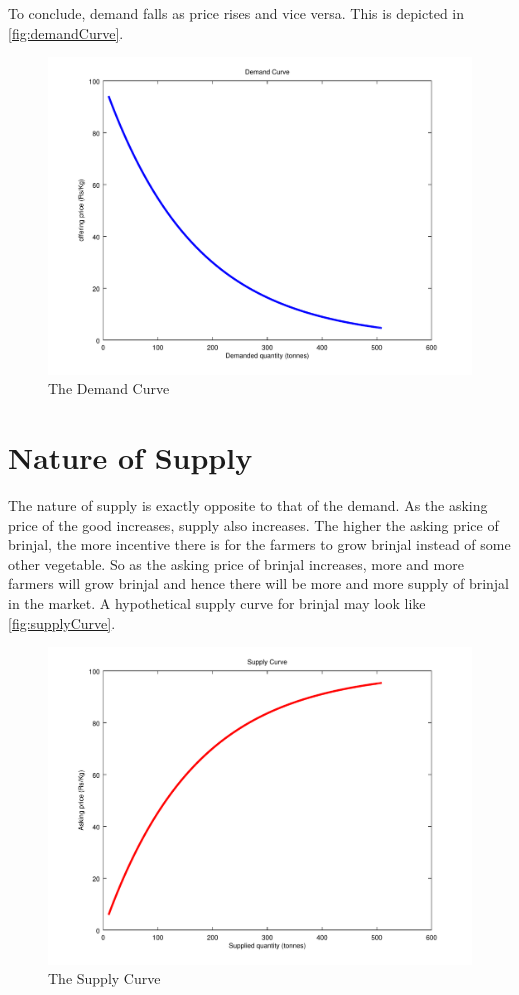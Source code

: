 To conclude, demand falls as price rises and vice versa. This is depicted in \autoref{fig:demandCurve}.
	\begin{figure}[h]
		\centering
		\includegraphics[width = \textwidth]{supplyDemand/demandCurve}
		\caption{The Demand Curve}
		\label{fig:demandCurve}
	\end{figure}
	
\section{Nature of Supply}
The nature of supply is exactly opposite to that of the demand. As the asking price of the good increases, supply also increases. The higher the asking price of brinjal, the more incentive there is for the farmers to grow brinjal instead of some other vegetable. So as the asking price of brinjal increases, more and more farmers will grow brinjal and hence there will be more and more supply of brinjal in the market. A hypothetical supply curve for brinjal may look like \autoref{fig:supplyCurve}.

	\begin{figure}[h]
		\centering
		\includegraphics[width = \textwidth]{supplyDemand/supplyCurve}
		\caption{The Supply Curve}
		\label{fig:supplyCurve}
	\end{figure}
	
